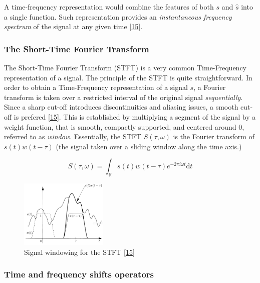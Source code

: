 \documentclass[
  american,
]{article}
\begin{document}
A time-frequency representation would combine the features
of both \(s\) and \(\hat s\) into a single function.
Such representation provides an \emph{instantaneous frequency spectrum}
of the signal at any given time {[}\protect\hyperlink{ref-grochenig2001}{15}{]}.

\hypertarget{the-short-time-fourier-transform}{%
\subsubsection{The Short-Time Fourier Transform}\label{the-short-time-fourier-transform}}

The Short-Time Fourier Transform (STFT) is a very common
Time-Frequency representation of a signal.
The principle of the STFT is quite straightforward.
In order to obtain a Time-Frequency representation of a signal \(s\),
a Fourier transform is taken over a restricted interval
of the original signal \emph{sequentially}.
Since a sharp cut-off introduces discontinuities and aliasing issues,
a smooth cut-off is prefered {[}\protect\hyperlink{ref-grochenig2001}{15}{]}.
This is established by multiplying a segment of the signal by a weight function,
that is smooth, compactly supported, and centered around \(0\),
referred to as \emph{window}.
Essentially, the STFT \(S(\tau,\omega)\) is the Fourier transform of \(s(t)w(t-\tau)\)
(the signal taken over a sliding window along the time axis.)

\begin{equation}
S(\tau,\omega) = \int_\mathbb{R}s(t)w(t-\tau)e^{-2\pi i\omega t} \mathrm{d}t
\end{equation}

\begin{figure}
\centering
\includegraphics[width=0.37\textwidth,height=\textheight]{img/stft_grochenig.png}
\caption{Signal windowing for the STFT {[}\protect\hyperlink{ref-grochenig2001}{15}{]}}
\end{figure}

\hypertarget{time-and-frequency-shifts-operators}{%
\subsubsection{Time and frequency shifts operators}\label{time-and-frequency-shifts-operators}}
\end{document}

